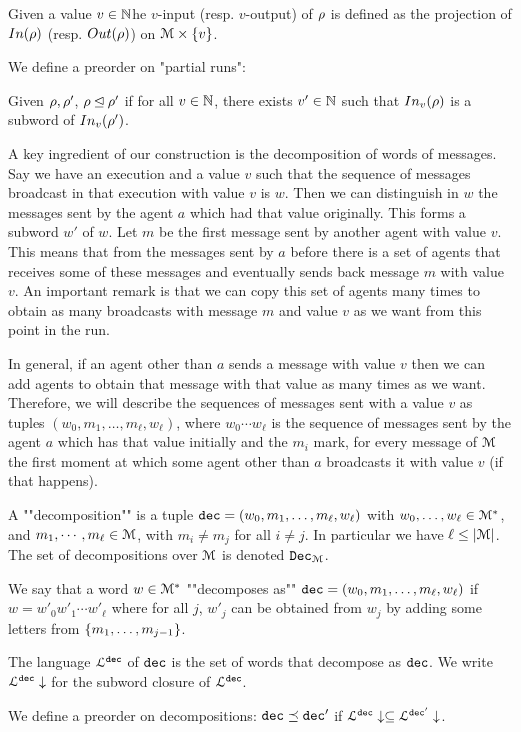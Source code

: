 \begin{definition}
	Given a value $v \in \mathbb{N} $he $v$-input (resp. $v$-output) of $\rho$ is defined as the projection of $In(\rho)$ (resp. $Out(\rho)$) on $\mathcal{M} \times \{v\}$.
	
	We define a preorder on "partial runs":
	
	Given $\rho, \rho'$, $\rho \unlhd \rho'$ if for all $v \in \mathbb{N}$, there exists $v' \in \mathbb{N}$ such that $In_{v}(\rho)$ is a subword of $In_{v}(\rho')$.
\end{definition}

A key ingredient of our construction is the decomposition of words of messages. Say we have an execution and a value $v$ such that the sequence of messages broadcast in that execution with value $v$ is $w$. Then we can distinguish in $w$ the messages sent by the agent $a$ which had that value originally. This forms a subword $w'$ of $w$. Let $m$ be the first message sent by another agent with value $v$. This means that from the messages sent by $a$ before there is a set of agents that receives some of these messages and eventually sends back message $m$ with value $v$. An important remark is that we can copy this set of agents many times to obtain as many broadcasts with message $m$ and value $v$ as we want from this point in the run.

In general, if an agent other than $a$ sends a message with value $v$ then we can add agents to obtain that message with that value as many times as we want.
Therefore, we will describe the sequences of messages sent with a value $v$ as tuples $(w_0, m_1, \ldots, m_\ell, w_\ell)$, where $w_0\cdots w_\ell$ is the sequence of messages sent by the agent $a$ which has that value initially and the $m_i$ mark, for every message of $\mathcal{M}$ the first moment at which some agent other than $a$ broadcasts it with value $v$ (if that happens).

\begin{definition}
	A ""decomposition"" is a tuple $\mathtt{dec} = (w_0, m_1, \ldots, m_\ell, w_\ell)$ with $w_0, \ldots, w_\ell \in \mathcal{M}^*$, and $m_1, \cdots, m_\ell \in \mathcal{M}$, with $m_i \neq m_j$ for all $i\neq j$. In particular we have $\ell \leq |\mathcal{M}|$. The set of decompositions over $\mathcal{M}$ is denoted $\mathtt{Dec}_{\mathcal{M}}$.
	
	We say that a word $w \in \mathcal{M}^*$ ""decomposes as"" $\mathtt{dec} = (w_0, m_1, \ldots, m_\ell, w_\ell)$ if $w = w'_0 w'_1 \cdots w'_\ell$ where for all $j$, $w'_j$ can be obtained from $w_j$ by adding some letters from $\{m_1, \ldots, m_{j-1}\}$.
	
	The language $\mathcal{L}^{\mathtt{\mathtt{dec}}}$ of $\mathtt{dec}$ is the set of words that decompose as $\mathtt{dec}$. We write $\mathcal{L}^{\mathtt{\mathtt{dec}}}\downarrow$ for the subword closure of $\mathcal{L}^{\mathtt{\mathtt{dec}}}$.
	
	We define a preorder on decompositions:
	$\mathtt{dec} \preceq \mathtt{dec}'$ if $\mathcal{L}^{\mathtt{\mathtt{dec}}}\downarrow \subseteq \mathcal{L}^{\mathtt{\mathtt{dec}'}}\downarrow$.
\end{definition}


